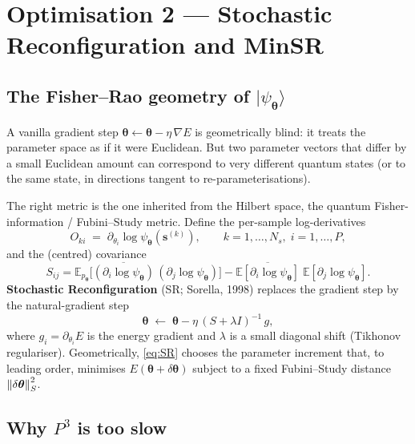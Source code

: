 \documentclass[11pt,a4paper]{article}
\newcommand{\E}{\mathbb{E}}
\newcommand{\bs}{\bm{s}}
\newcommand{\btheta}{\bm{\theta}}
\newcommand{\psip}{\psi_{\btheta}}
\theoremstyle{definition}
\theoremstyle{plain}
\begin{document}
\section{Optimisation 2 — Stochastic Reconfiguration and MinSR}

\subsection{The Fisher--Rao geometry of \texorpdfstring{$|\psip\rangle$}{psi}}

A vanilla gradient step
$\btheta \leftarrow \btheta - \eta\,\nabla E$ is geometrically blind: it
treats the parameter space as if it were Euclidean. But two parameter
vectors that differ by a small Euclidean amount can correspond to very
different quantum states (or to the same state, in directions tangent to
re-parameterisations).

The right metric is the one inherited from the Hilbert space, the
quantum Fisher-information / Fubini--Study metric. Define the per-sample
log-derivatives
\begin{equation}
   O_{ki} \;=\; \partial_{\theta_{i}} \log\psip(\bs^{(k)}),
   \qquad k=1,\dots,N_{s},\; i=1,\dots,P,
\label{eq:O}
\end{equation}
and the (centred) covariance
\begin{equation}
   S_{ij}
   = \E_{p_{\btheta}}
     \bigl[\overline{(\partial_{i}\log\psip)}\,(\partial_{j}\log\psip)\bigr]
     - \overline{\E[\partial_{i}\log\psip]}\;\E[\partial_{j}\log\psip].
\end{equation}
\textbf{Stochastic Reconfiguration} (SR; Sorella, 1998) replaces the gradient
step by the natural-gradient step
\begin{equation}
\boxed{\;
   \btheta \;\leftarrow\; \btheta - \eta\,(S+\lambda I)^{-1}\, g,
\;}
\label{eq:SR}
\end{equation}
where $g_{i} = \partial_{\theta_{i}} E$ is the energy gradient and
$\lambda$ is a small diagonal shift (Tikhonov regulariser). Geometrically,
\eqref{eq:SR} chooses the parameter increment that, to leading order,
minimises $E(\btheta + \delta\btheta)$ subject to a fixed Fubini--Study
distance $\norm{\delta\btheta}_{S}^{2}$.

\subsection{Why \texorpdfstring{$P^{3}$}{P\textasciicircum 3} is too slow}
\end{document}
